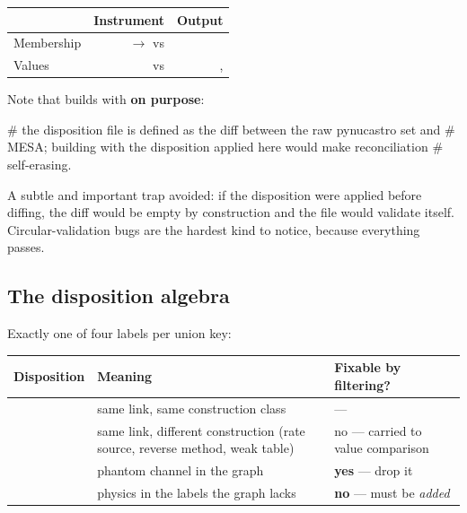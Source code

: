 \begin{center}
\begin{tabularx}{\textwidth}{@{}L{2.1cm} R{1.15} R{0.85}@{}}
\toprule
 & \textbf{Instrument} & \textbf{Output} \\
\midrule
Membership &  $\to$ 
  vs  &  \\
Values &  vs
   &
  ,  \\
\bottomrule
\end{tabularx}
\end{center}

Note that  builds with 
\textbf{on purpose}:

\begin{srclisting}
# the disposition file is defined as the diff between the raw pynucastro set and
# MESA; building with the disposition applied here would make reconciliation
# self-erasing.
\end{srclisting}

A subtle and important trap avoided: if the disposition were applied before
diffing, the diff would be empty by construction and the file would validate
itself. Circular-validation bugs are the hardest kind to notice, because
everything passes.

\subsection{The disposition algebra}
\label{sec:disposition}

Exactly one of four labels per union key:

\begin{center}
\begin{tabularx}{\textwidth}{@{}L{4.4cm} Y L{3.0cm}@{}}
\toprule
\textbf{Disposition} & \textbf{Meaning} & \textbf{Fixable by filtering?} \\
\midrule
{} & same link, same construction class & --- \\
 & same link, different construction (rate source,
  reverse method, weak table) & no --- carried to value comparison \\
 & phantom channel in the graph & \textbf{yes} --- drop it \\
 & physics in the labels the graph lacks &
  \textbf{no} --- must be \emph{added} \\
\bottomrule
\end{tabularx}
\end{center}

